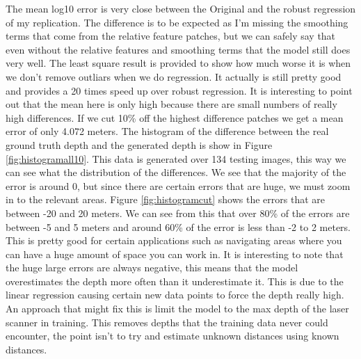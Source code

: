 \documentclass[journal]{IEEEtran}
\begin{document}
The mean log10 error is very close between the Original and the robust regression of my replication. The difference is to be expected as I'm missing the smoothing terms that come from the relative feature patches, but we can safely say that even without the relative features and smoothing terms that the model still does very well. The least square result is provided to show how much worse it is when we don't remove outliars when we do regression. It actually is still pretty good and provides a 20 times speed up over robust regression. It is interesting to point out that the mean here is only high because there are small numbers of really high differences. If we cut 10\% off the highest difference patches we get a mean error of only 4.072 meters. The histogram of the difference between the real ground truth depth and the generated depth is show in Figure \ref{fig:histogramall10}. This data is generated over 134 testing images, this way we can see what the distribution of the differences. We see that the majority of the error is around 0, but since there are certain errors that are huge, we must zoom in to the relevant areas. Figure \ref{fig:histogramcut} shows the errors that are between -20 and 20 meters. We can see from this that over 80\% of the errors are between -5 and 5 meters and around 60\% of the error is less than -2 to 2 meters. This is pretty good for certain applications such as navigating areas where you can have a huge amount of space you can work in. It is interesting to note that the huge large errors are always negative, this means that the model overestimates the depth more often than it underestimate it. This is due to the linear regression causing certain new data points to force the depth really high. An approach that might fix this is limit the model to the max depth of the laser scanner in training. This removes depths that the training data never could encounter, the point isn't to try and estimate unknown distances using known distances.
\end{document}
